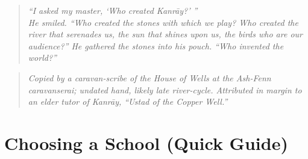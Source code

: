 \documentclass[11pt]{article}
\renewcommand{\arraystretch}{1.15}
\begin{document}
\clearpage


\begin{quote}\small\itshape
``I asked my master, `Who created Kanrāy?' ''\\[2pt]
He smiled. ``Who created the stones with which we play? Who created the river that serenades us, the sun that shines upon us, the birds who are our audience?'' 
He gathered the stones into his pouch. ``Who invented the world?''
\end{quote}

\begin{quote}\footnotesize\itshape
Copied by a caravan-scribe of the House of Wells at the Ash-Fenn caravanserai; undated hand, likely late river-cycle. 
Attributed in margin to an elder tutor of Kanrāy, “Ustad of the Copper Well.” 
\end{quote}

\section*{Choosing a School (Quick Guide)}

\setlength{\tabcolsep}{3pt}
\renewcommand{\arraystretch}{1.12}

\bigskip
\end{document}
